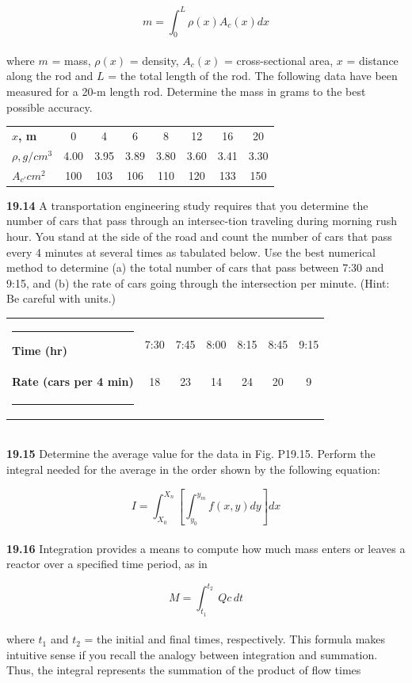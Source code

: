 \documentclass[../main.tex]{subfiles}
\begin{document}
\begin{multicols}{2}
	$$m=\int^{L}_{0} \rho(x)A_c(x)dx$$\\
where $m$ = mass, $ρ(x)$ = density, $A_c(x)$ = cross-sectional area,
$x$ = distance along the rod and $L$ = the total length of the rod.
The following data have been measured for a 20-m length
rod. Determine the mass in grams to the best possible
accuracy.\\
\begin{tabular}{lccccccc}
	\hline
	\scriptsize{\textbf{$x$, m}} & \scriptsize{0} & \scriptsize{4} & \scriptsize{6} & \scriptsize{8} & \scriptsize{12} & \scriptsize{16} & \scriptsize{20}\\
	\scriptsize{\textbf{$\rho, g/cm^3$}} & \scriptsize{4.00} & \scriptsize{3.95} & \scriptsize{3.89} & \scriptsize{3.80} & \scriptsize{3.60} & \scriptsize{3.41} & \scriptsize{3.30}\\
	\scriptsize{\textbf{$A_{c'}cm^{2}$}} & \scriptsize{100} & \scriptsize{103} & \scriptsize{106} & \scriptsize{110} & \scriptsize{120} & \scriptsize{133} & \scriptsize{150}\\ 	\hline
\end{tabular}

\textbf{19.14} A transportation engineering study requires that you
determine the number of cars that pass through an intersec-tion traveling during morning rush hour. You stand at the
side of the road and count the number of cars that pass every
4 minutes at several times as tabulated below. Use the best
numerical method to determine (a) the total number of cars
that pass between 7:30 and 9:15, and (b) the rate of cars
going through the intersection per minute. (Hint: Be careful
with units.)\\
\begin{tabular}{p{0.6in}cccccc}
	\hrule
	\scriptsize{\textbf{Time (hr)}} & \scriptsize{7:30} & \scriptsize{7:45} & \scriptsize{8:00} & \scriptsize{8:15} & \scriptsize{8:45} & \scriptsize{9:15}\\
	\scriptsize{\textbf{Rate (cars per 4 min)}} & \scriptsize{18} & \scriptsize{23} & \scriptsize{14} & \scriptsize{24} & \scriptsize{20} & \scriptsize{9}\\ \hrule
\end{tabular}\\

\textbf{19.15} Determine the average value for the data in Fig. P19.15.
Perform the integral needed for the average in the order shown
by the following equation:
	
	$$I=\int^{X_{n}}_{X_{0}}\left[\int^{y_{m}}_{y_{0}} f(x,y)dy \right]dx$$\\
	
\textbf{19.16} Integration provides a means to compute how much
mass enters or leaves a reactor over a specified time period,
as in

	$$M=\int^{t_2}_{t_1}\ Q c\,dt$$\\
where $t_1$ and $t_2$ = the initial and final times, respectively.
This formula makes intuitive sense if you recall the analogy
between integration and summation. Thus, the integral
represents the summation of the product of flow times

\end{multicols}
\end{document}
